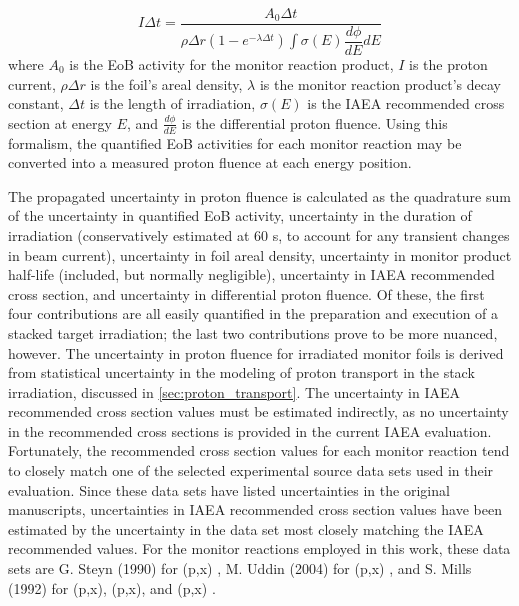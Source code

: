 \documentclass[3p]{elsarticle}
\newcommand{\pp}[1]{\left( #1\right)}
\begin{document}
\begin{equation}
I \Delta t = \dfrac{A_0 \Delta t}{\rho \Delta r \pp{1-e^{-\lambda \Delta t}} \int \sigma\pp{E} \dfrac{d\phi}{dE} dE}
\end{equation}
where $A_0$ is the EoB activity for the monitor reaction product, $I$ is the proton current, $\rho \Delta r$ is the foil's areal density, $\lambda$ is the monitor reaction product's decay constant, $\Delta t$ is the length of irradiation, $\sigma\pp{E}$ is the IAEA recommended cross section at energy $E$, and $\frac{d\phi}{dE}$ is the differential proton fluence.
Using this formalism, the quantified EoB activities for each monitor reaction may be converted into a measured proton fluence at each energy position.



The propagated uncertainty in proton fluence is calculated as the quadrature sum of the uncertainty in quantified EoB activity, uncertainty in the duration of irradiation (conservatively estimated at 60 s, to account for any transient changes in beam current), uncertainty in foil areal density, uncertainty in monitor product half-life (included, but normally negligible), uncertainty in IAEA recommended cross section, and uncertainty in differential proton fluence.
Of these, the first four contributions are all easily quantified in the preparation and execution of a stacked target irradiation;  the last two contributions prove to be more nuanced, however.
The uncertainty in proton fluence for irradiated monitor foils is derived from statistical uncertainty in the modeling of proton transport in the stack irradiation, discussed in \autoref{sec:proton_transport}.
The uncertainty in IAEA recommended cross section values must be estimated indirectly, as no uncertainty in the  recommended cross sections is provided in the current IAEA evaluation.
Fortunately, the recommended cross section values for each monitor reaction tend to closely match one of the   selected experimental source data sets used in their evaluation.
Since these data sets have listed uncertainties in the original manuscripts, uncertainties in  IAEA recommended cross section values have been estimated by the uncertainty in the data set most closely matching the  IAEA recommended  values.
For the monitor reactions employed in this work, these data sets are G. Steyn (1990) for  (p,x) \cite{Steyn1990}, M. Uddin (2004) for (p,x) \cite{Uddin2004}, and S. Mills (1992) for (p,x), (p,x), and (p,x) \cite{Mills1992}.
\end{document}
